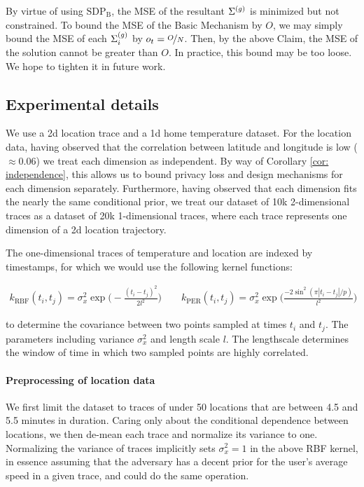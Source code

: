 By virtue of using $\text{SDP}_\text{B}$, the MSE of the resultant $\Sigma^{(g)}$ is minimized but not constrained. To bound the MSE of the Basic Mechanism by $O$, we may simply bound the MSE of each $\Sigma^{(g)}_i$ by $o_t = \nicefrac{O}{N}$. Then, by the above Claim, the MSE of the solution cannot be greater than $O$. In practice, this bound may be too loose. We hope to tighten it in future work. 

\subsection{Experimental details}
\label{apx: experiments}

We use a 2d location trace and a 1d home temperature dataset. For the location data, having observed that the correlation between latitude and longitude is low ($ \approx 0.06$) we treat each dimension as independent. By way of Corollary \ref{cor: independence}, this allows us to bound privacy loss and design mechanisms for each dimension separately. Furthermore, having observed that each dimension fits the nearly the same conditional prior, we treat our dataset of 10k 2-dimensional traces as a dataset of 20k 1-dimensional traces, where each trace represents one dimension of a 2d location trajectory. 

The one-dimensional traces of temperature and location are indexed by timestamps, for which we would use the following kernel functions: 

\begin{align}
	k_{\text{RBF}}(t_i, t_j) 
	=  \sigma_x^2 \exp \Big( -\frac{(t_i - t_j)^2}{2 l^2} \Big) 
	\quad \quad 
	k_{\text{PER}}(t_i, t_j) 
	=  \sigma_x^2 \exp \Big(  \frac{-2 \sin^2(\pi |t_i - t_j| / p)}{l^2} \Big)
\end{align}

to determine the covariance between two points sampled at times $t_i$ and $t_j$. The parameters including variance $\sigma_x^2$ and length scale $l$. The lengthscale determines the window of time in which two sampled points are highly correlated. 

\paragraph{Preprocessing of location data} We first limit the dataset to traces of under 50 locations that are between 4.5 and 5.5 minutes in duration. Caring only about the conditional dependence between locations, we then de-mean each trace and normalize its variance to one. Normalizing the variance of traces implicitly sets $\sigma_x^2 = 1$ in the above RBF kernel, in essence assuming that the adversary has a decent prior for the user's average speed in a given trace, and could do the same operation. 


